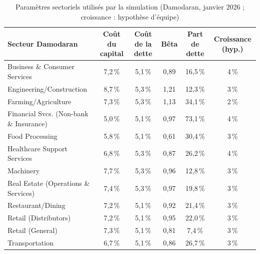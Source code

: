 \begin{table}[htbp]
\centering
\footnotesize\setlength{\tabcolsep}{4pt}
\caption{Paramètres sectoriels utilisés par la simulation (Damodaran, janvier 2026 ; croissance : hypothèse d'équipe)}\label{tab:damodaran}
\begin{tabular}{lccccc}
\toprule
Secteur Damodaran & Coût du capital & Coût de la dette & Bêta & Part de dette & Croissance (hyp.) \\
\midrule
Business \& Consumer Services & 7,2\,\% & 5,1\,\% & 0,89 & 16,5\,\% & 4\,\% \\
Engineering/Construction & 8,7\,\% & 5,3\,\% & 1,21 & 12,3\,\% & 3\,\% \\
Farming/Agriculture & 7,3\,\% & 5,3\,\% & 1,13 & 34,1\,\% & 2\,\% \\
Financial Svcs. (Non-bank \& Insurance) & 5,0\,\% & 5,1\,\% & 0,97 & 73,1\,\% & 4\,\% \\
Food Processing & 5,8\,\% & 5,1\,\% & 0,61 & 30,4\,\% & 3\,\% \\
Healthcare Support Services & 6,8\,\% & 5,3\,\% & 0,87 & 26,2\,\% & 4\,\% \\
Machinery & 7,7\,\% & 5,3\,\% & 0,96 & 12,8\,\% & 3\,\% \\
Real Estate (Operations \& Services) & 7,4\,\% & 5,3\,\% & 0,97 & 19,8\,\% & 3\,\% \\
Restaurant/Dining & 7,2\,\% & 5,1\,\% & 0,92 & 21,4\,\% & 3\,\% \\
Retail (Distributors) & 7,2\,\% & 5,1\,\% & 0,95 & 22,0\,\% & 3\,\% \\
Retail (General) & 7,3\,\% & 5,1\,\% & 0,81 & 7,4\,\% & 3\,\% \\
Transportation & 6,7\,\% & 5,1\,\% & 0,86 & 26,7\,\% & 3\,\% \\
\bottomrule
\end{tabular}
\end{table}
